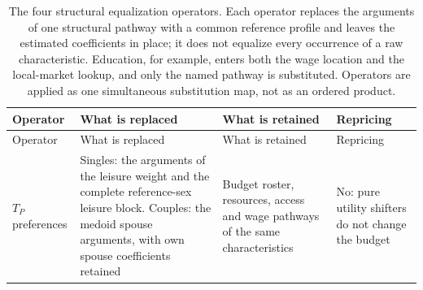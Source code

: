 \small\setlength{\tabcolsep}{3pt}\begin{longtable}[]{@{}
  >{\raggedright\arraybackslash}p{}
  >{\raggedright\arraybackslash}p{}
  >{\raggedright\arraybackslash}p{}
  >{\raggedright\arraybackslash}p{}@{}}
\caption{The four structural equalization operators. Each operator replaces the arguments of one structural pathway with a common reference profile and leaves the estimated coefficients in place; it does not equalize every occurrence of a raw characteristic. Education, for example, enters both the wage location and the local-market lookup, and only the named pathway is substituted. Operators are applied as one simultaneous substitution map, not as an ordered product.}\tabularnewline
\toprule\noalign{}
\begin{minipage}[b]{\linewidth}\raggedright
Operator
\end{minipage} & \begin{minipage}[b]{\linewidth}\raggedright
What is replaced
\end{minipage} & \begin{minipage}[b]{\linewidth}\raggedright
What is retained
\end{minipage} & \begin{minipage}[b]{\linewidth}\raggedright
Repricing
\end{minipage} \\
\midrule\noalign{}
\endfirsthead
\toprule\noalign{}
\begin{minipage}[b]{\linewidth}\raggedright
Operator
\end{minipage} & \begin{minipage}[b]{\linewidth}\raggedright
What is replaced
\end{minipage} & \begin{minipage}[b]{\linewidth}\raggedright
What is retained
\end{minipage} & \begin{minipage}[b]{\linewidth}\raggedright
Repricing
\end{minipage} \\
\midrule\noalign{}
\endhead
\bottomrule\noalign{}
\endlastfoot
\(T_P\) preferences & Singles: the arguments of the leisure weight and the complete reference-sex leisure block. Couples: the medoid spouse arguments, with own spouse coefficients retained & Budget roster, resources, access and wage pathways of the same characteristics & No: pure utility shifters do not change the budget \\

\end{longtable}
